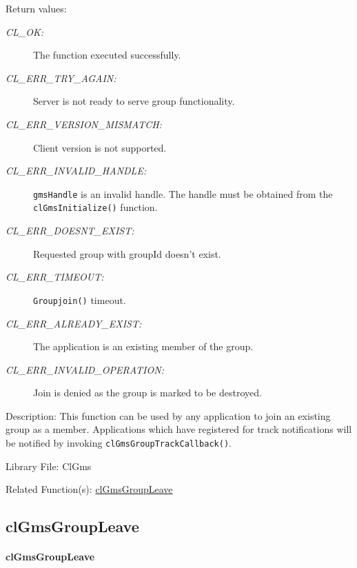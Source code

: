 \begin{flushleft}
     \begin{Desc}
     \item[Return values:]
     \begin{description}
     \item[{\em CL\_\-OK:}]The function executed successfully.
    \item[{\em CL\_\-ERR\_\-TRY\_\-AGAIN:}] Server is not ready to serve group functionality.
        \item[{\em CL\_\-ERR\_\-VERSION\_\-MISMATCH:}] Client version is not supported.
       \item[{\em CL\_\-ERR\_\-INVALID\_\-HANDLE:}] {\tt{gmsHandle}} is an invalid handle. The handle must be obtained from the
{\tt{clGmsInitialize()}} function. 
       \item[{\em CL\_\-ERR\_\-DOESNT\_\-EXIST:}] Requested group with groupId doesn't exist.
                  \item[{\em CL\_\-ERR\_\-TIMEOUT:}] {\tt{Groupjoin()}} timeout.
                  \item[{\em CL\_\-ERR\_\-ALREADY\_\-EXIST:}] The application is an existing member of the group.
          \item[{\em CL\_\-ERR\_\-INVALID\_\-OPERATION:}] Join is denied as the group is marked to be destroyed.
      \end{description}
       \end{Desc}

      \begin{Desc}
      \item[Description:]
    This function can be used by any application to join an existing group as a member. Applications which have registered for track notifications will
    be notified by invoking {\tt{clGmsGroupTrackCallback()}}.
 \end{Desc}
     \begin{Desc}
    \item[Library File:]Cl\-Gms\end{Desc}
    \begin{Desc}
  \item[Related Function(s):] \hyperlink{pagegms113}{clGmsGroupLeave}
  \end{Desc}



  \newpage
      \subsection{clGmsGroupLeave}
  \hypertarget{pagegms113}{}\paragraph{cl\-Gms\-Group\-Leave}\label{pagegms113}
      \begin{Desc}


\end{Desc}
\end{flushleft}
